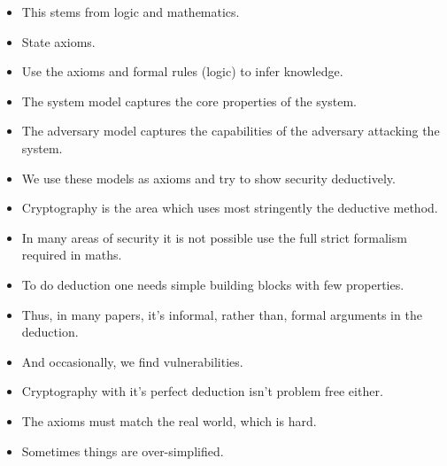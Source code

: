 \begin{frame}
  \begin{definition}[Deduction]
    \begin{itemize}
      \item This stems from logic and mathematics.
      \item State axioms.
      \item Use the axioms and formal rules (logic) to infer knowledge.
    \end{itemize}
  \end{definition}
\end{frame}

\begin{frame}
  \begin{example}
    \begin{itemize}
      \item The system model captures the core properties of the system.
      \item The adversary model captures the capabilities of the adversary 
        attacking the system.
      \item We use these models as axioms and try to show security deductively.
    \end{itemize}
  \end{example}
\end{frame}

\begin{frame}
  \begin{remark}
    \begin{itemize}
      \item Cryptography is the area which uses most stringently the deductive 
        method.
      \item In many areas of security it is not possible use the full strict 
        formalism required in maths.
      \item To do deduction one needs simple building blocks with few 
        properties.
      \item Thus, in many papers, it's informal, rather than, formal arguments 
        in the deduction.
      \item And occasionally, we find vulnerabilities.
    \end{itemize}
  \end{remark}
\end{frame}

\begin{frame}
  \begin{remark}
    \begin{itemize}
      \item Cryptography with it's perfect deduction isn't problem free either.
      \item The axioms must match the real world, which is hard.
      \item Sometimes things are over-simplified.
    \end{itemize}
  \end{remark}
\end{frame}

